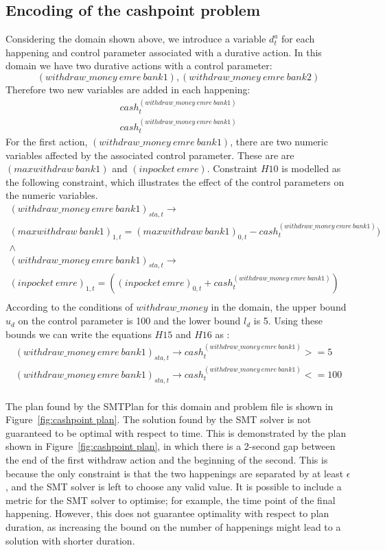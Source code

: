 \subsection{Encoding of the cashpoint problem}

Considering the domain shown above, we introduce a variable $d^a_t$ for each happening and control parameter associated with a durative action. In this domain we have two durative actions with a control parameter:
$$
(withdraw\_money\ emre\ bank1), (withdraw\_money\ emre\ bank2)
$$
Therefore two new variables are added in each happening:
$$
\begin{array}{l}
cash^{(withdraw\_money\ emre\ bank1)}_t\\
cash^{(withdraw\_money\ emre\ bank1)}_t
\end{array}
$$
For the first action, $(withdraw\_money\ emre\ bank1)$, there are two numeric variables affected by the associated control parameter. These are are $(maxwithdraw \ bank1)$ and  $(inpocket \ emre)$. Constraint $H10$ is modelled as the following constraint, which illustrates the effect of the control parameters on the numeric variables.
$$
\begin{array}{c}
(withdraw\_money\ emre\ bank1)_{sta,t}  \rightarrow \\
(maxwithdraw\ bank1)_{1,t} = (maxwithdraw\ bank1)_{0,t} - cash^{(withdraw\_money\ emre\ bank1)}_t) \\
\wedge \\
(withdraw\_money\ emre\ bank1)_{sta,t}  \rightarrow \\
(inpocket\ emre)_{1,t} = ((inpocket\ emre)_{0,t} + cash^{(withdraw\_money\ emre\ bank1)}_t) \\
\end{array}
$$
According to the conditions of $withdraw\_money$ in the domain, the upper bound $u_d$ on the control parameter is 100 and the lower bound $l_d$ is 5. Using these bounds we can write the equations $H15$ and $H16$ as :
$$
\begin{array}{l}
(withdraw\_money\ emre\ bank1)_{sta,t}  \rightarrow cash^{(withdraw\_money\ emre\ bank1)}_t >=  5 \\
(withdraw\_money\ emre\ bank1)_{sta,t}  \rightarrow cash^{(withdraw\_money\ emre\ bank1)}_t <=  100  \\
\end{array}
$$

The plan found by the SMTPlan for this domain and problem file is shown in Figure~\ref{fig:cashpoint plan}. The solution found by the SMT solver is not guaranteed to be optimal with respect to time. This is demonstrated by the plan shown in Figure~\ref{fig:cashpoint plan}, in which there is a 2-second gap between the end of the first withdraw action and the beginning of the second. This is because the only constraint is that the two happenings are separated by at least $\epsilon$, and the SMT solver is left to choose any valid value. It is possible to include a metric for the SMT solver to optimise; for example, the time point of the final happening. However, this does not guarantee optimality with respect to plan duration, as increasing the bound on the number of happenings might lead to a solution with shorter duration.

